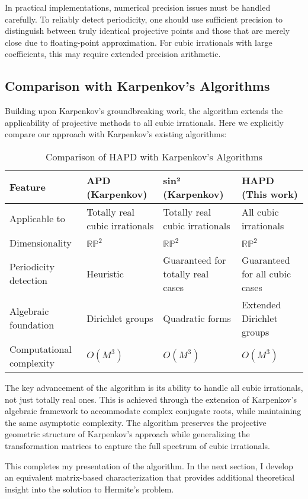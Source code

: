 \begin{remark}
In practical implementations, numerical precision issues must be handled carefully. To reliably detect periodicity, one should use sufficient precision to distinguish between truly identical projective points and those that are merely close due to floating-point approximation. For cubic irrationals with large coefficients, this may require extended precision arithmetic.
\end{remark}

\subsection{Comparison with Karpenkov's Algorithms}

Building upon Karpenkov's groundbreaking work, the \HAPD{} algorithm extends the applicability of projective methods to all cubic irrationals. Here we explicitly compare our approach with Karpenkov's existing algorithms:

\begin{table}[h]
\centering
\caption{Comparison of HAPD with Karpenkov's Algorithms}
\label{tab:algorithm_comparison}
\begin{tabular}{|p{}|p{}|p{}|p{}|}
\hline
\textbf{Feature} & \textbf{APD (Karpenkov)} & \textbf{sin² (Karpenkov)} & \textbf{HAPD (This work)} \\
\hline
Applicable to & Totally real cubic irrationals & Totally real cubic irrationals & All cubic irrationals \\
\hline
Dimensionality & $\mathbb{RP}^2$ & $\mathbb{RP}^2$ & $\mathbb{RP}^2$ \\
\hline
Periodicity detection & Heuristic & Guaranteed for totally real cases & Guaranteed for all cubic cases \\
\hline
Algebraic foundation & Dirichlet groups & Quadratic forms & Extended Dirichlet groups \\
\hline
Computational complexity & $O(M^3)$ & $O(M^3)$ & $O(M^3)$ \\
\hline
\end{tabular}
\end{table}

The key advancement of the \HAPD{} algorithm is its ability to handle all cubic irrationals, not just totally real ones. This is achieved through the extension of Karpenkov's algebraic framework to accommodate complex conjugate roots, while maintaining the same asymptotic complexity. The algorithm preserves the projective geometric structure of Karpenkov's approach while generalizing the transformation matrices to capture the full spectrum of cubic irrationals.

This completes my presentation of the \HAPD{} algorithm. In the next section, I develop an equivalent matrix-based characterization that provides additional theoretical insight into the solution to Hermite's problem.
